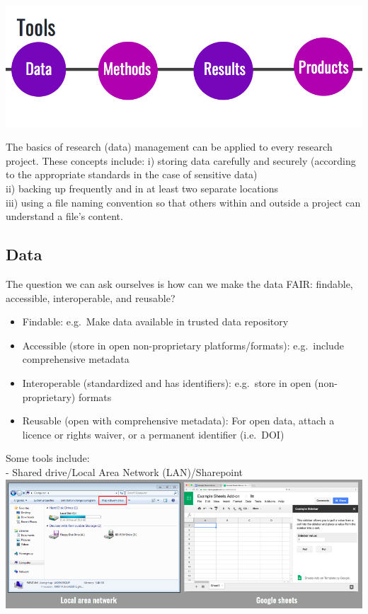 \documentclass[
  12pt,
]{book}
\providecommand{\tightlist}{%
  \setlength{\itemsep}{0pt}\setlength{\parskip}{0pt}}
\begin{document}
\includegraphics{rr-presentation-figure/tools.png}

The basics of research (data) management can be applied to every research project. These concepts include:
i) storing data carefully and securely (according to the appropriate standards in the case of sensitive data)\\
ii) backing up frequently and in at least two separate locations\\
iii) using a file naming convention so that others within and outside a project can understand a file's content.

\hypertarget{data}{%
\subsection{Data}\label{data}}

The question we can ask ourselves is how can we make the data FAIR: findable, accessible, interoperable, and reusable?

\begin{itemize}
\tightlist
\item
  Findable: e.g.~Make data available in trusted data repository\\
\item
  Accessible (store in open non-proprietary platforms/formats): e.g.~include comprehensive metadata
\item
  Interoperable (standardized and has identifiers): e.g.~store in open (non-proprietary) formats
\item
  Reusable (open with comprehensive metadata): For open data, attach a licence or rights waiver, or a permanent identifier (i.e.~DOI)
\end{itemize}

Some tools include:\\
- Shared drive/Local Area Network (LAN)/Sharepoint\\
\includegraphics{rr-presentation-figure/LAN.png}
\end{document}
